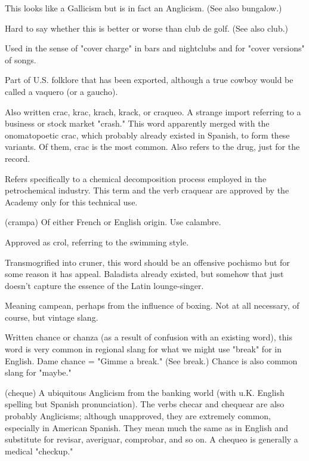  This looks like a Gallicism but is in fact an Anglicism. (See also bungalow.)

 Hard to say whether this is better or worse
than club de golf. (See also club.)

 Used in the sense of "cover charge" in bars and nightclubs and for "cover versions" of songs.

 Part of U.S. folklore that has been exported, although a true cowboy would be called a vaquero (or a gaucho).

 Also written crac, krac, krach, krack, or craqueo. A
strange import referring to a business or stock market "crash." This
word apparently merged with the onomatopoetic crac, which probably
already existed in Spanish, to form these variants. Of them, crac is the
most common. Also refers to the drug, just for the record.

 Refers specifically to a chemical decomposition
process employed in the petrochemical industry. This term and the
verb craquear are approved by the Academy only for this technical use.

 (crampa) Of either French or English origin. Use
calambre.

 Approved as crol, referring to the swimming style.

 Transmogrified into cruner, this word should be
an offensive pochismo but for some reason it has appeal. Baladista already existed, but somehow that just doesn't capture the essence of the
Latin lounge-singer.

 Meaning campean, perhaps from the influence of
boxing. Not at all necessary, of course, but vintage slang.

 Written chance or chanza (as a result of confusion
with an existing word), this word is very common in regional slang for
what we might use "break" for in English. Dame chance = "Gimme a
break." (See break.) Chance is also common slang for "maybe."

 (cheque) A ubiquitous Anglicism from the banking world (with u.K. English spelling but Spanish pronunciation). The
verbs checar and chequear are also probably Anglicisms; although unapproved, they are extremely common, especially in American Spanish. They mean much the same as in English and substitute for revisar,
averiguar, comprobar, and so on. A chequeo is generally a medical
"checkup."

